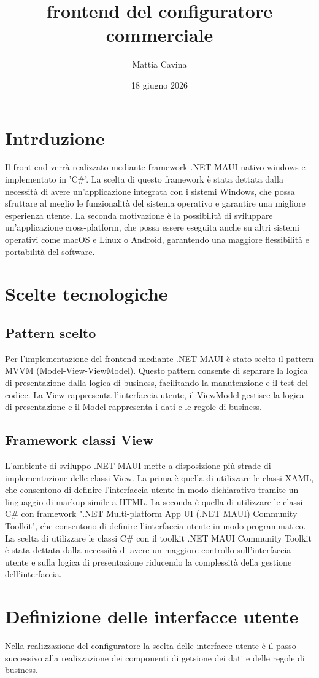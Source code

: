 \documentclass[12pt, a4paper]{article}
\title{frontend del configuratore commerciale}
\author{Mattia Cavina}
\date{18 giugno 2026}
\begin{document}
\section{Intrduzione}
Il front end verrà realizzato mediante framework .NET MAUI nativo windows e implementato in 'C\#'.
La scelta di questo framework è stata dettata dalla necessità di avere un'applicazione integrata con i sistemi Windows,
 che possa sfruttare al meglio le funzionalità del sistema operativo e garantire una migliore esperienza utente.
La seconda motivazione è la possibilità di sviluppare un'applicazione cross-platform,
che possa essere eseguita anche su altri sistemi operativi come macOS e Linux o Android,
garantendo una maggiore flessibilità e portabilità del software.

\section{Scelte tecnologiche}
\subsection{Pattern scelto}
Per l'implementazione del frontend mediante .NET MAUI è stato scelto il pattern MVVM (Model-View-ViewModel).
Questo pattern consente di separare la logica di presentazione dalla logica di business,
facilitando la manutenzione e il test del codice.
La View rappresenta l'interfaccia utente, il ViewModel gestisce la logica di presentazione e il Model
rappresenta i dati e le regole di business.

\subsection{Framework classi View}
L'ambiente di sviluppo .NET MAUI mette a disposizione più strade di implementazione delle classi View.
La prima è quella di utilizzare le classi XAML, che consentono di definire l'interfaccia utente in modo dichiarativo tramite 
un linguaggio di markup simile a HTML.
La seconda è quella di utilizzare le classi C\# con framework ".NET Multi-platform App UI (.NET MAUI) Community Toolkit",
che consentono di definire l'interfaccia utente in modo programmatico.
La scelta di utilizzare le classi C\# con il toolkit .NET MAUI Community Toolkit
è stata dettata dalla necessità di avere un maggiore controllo sull'interfaccia utente
e sulla logica di presentazione riducendo la complessità della gestione dell'interfaccia.

\section{Definizione delle interfacce utente}
Nella realizzazione del configuratore la scelta delle interfacce utente è il passo
successivo alla realizzazione dei componenti di getsione dei dati e delle regole di business.
\end{document}
